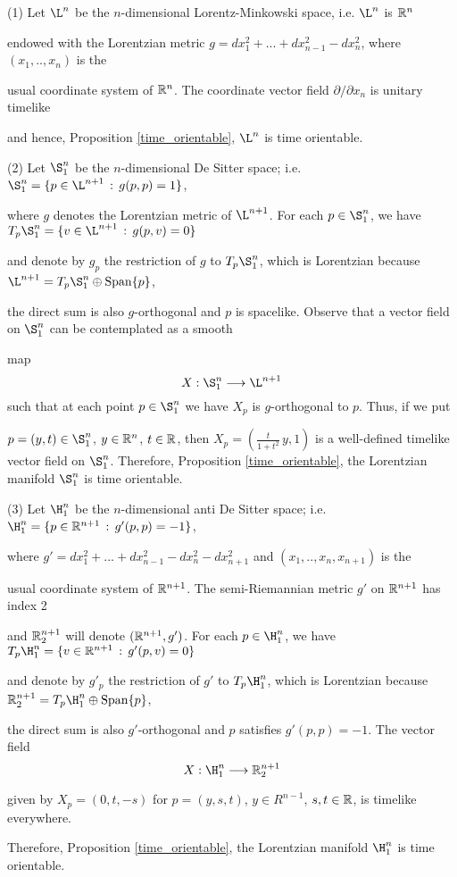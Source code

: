 \begin{exam}{\rm (1) Let $\L^n$ be the $n$-dimensional Lorentz-Minkowski space, i.e. $\L^n$ is $\mathbb{R}^n$

endowed with the Lorentzian metric $g=dx_1^2+...+dx_{n-1}^2-dx_n^2$, where $(x_1,..,x_n)$ is the

usual coordinate system of $\mathbb{R}^n$. The coordinate vector field $\partial/\partial x_n$ is unitary timelike

and hence, Proposition \ref{time_orientable}, $\L ^n$ is time orientable.


\vspace{2mm}


\noindent (2) Let $\S_1^n$ be the $n$-dimensional De Sitter space; i.e. $\S_1^n =\{p \in \L^{n+1} \, :\, g(p,p)=1 \}$,

where $g$ denotes the Lorentzian metric of $\L^{n+1}$. For each $p \in \S_1^n$, we have $T_p\S_1^n=\{v \in \L^{n+1} \, : \, g(p,v)=0\}$

and denote by $g_p$ the restriction of $g$ to $T_p\S_1^n$, which is Lorentzian because $\L^{n+1}=T_p\S_1^n \oplus \mathrm{Span}\{p\}$,

the direct sum is also $g$-orthogonal and $p$ is spacelike. Observe that a vector field on $\S_1^n$ can be contemplated as a smooth

map $$X : \S_1^n \longrightarrow \L^{n+1}$$ such that at each point $p \in \S_1^n$ we have $X_p$ is $g$-orthogonal to $p$. Thus, if we put

$p=(y,t)\in \S_1^n$, $y \in \mathbb{R}^n$, $t \in \mathbb{R}$, then $X_p=(\frac{t}{1+t^2}\,y,1)$ is a well-defined timelike vector field on $\S_1^n$. Therefore, Proposition \ref{time_orientable}, the Lorentzian manifold $\S_1^n$ is time orientable.


\vspace{2mm}


\noindent (3) Let $\H_1^n$ be the $n$-dimensional anti De Sitter space; i.e. $\H_1^n =\{p \in \R^{n+1} \, :\, g'(p,p)=-1 \}$,

where $g'=dx_1^2+...+dx_{n-1}^2-dx_n^2-dx_{n+1}^2$ and $(x_1,..,x_n,x_{n+1})$ is the

usual coordinate system of $\mathbb{R}^{n+1}$. The semi-Riemannian metric $g'$ on $\mathbb{R}^{n+1}$ has index 2

and $\mathbb{R}^{n+1}_2$ will denote $(\mathbb{R}^{n+1},g')$. For each $p \in \H_1^n$, we have $T_p\H_1^n=\{v \in \R^{n+1} \, : \, g'(p,v)=0\}$

and denote by $g'_p$ the restriction of $g'$ to $T_p\H_1^n$, which is Lorentzian because $\R^{n+1}_2=T_p\H_1^n \oplus \mathrm{Span}\{p\}$,

the direct sum is also $g'$-orthogonal and $p$ satisfies $g'(p,p)=-1$. The vector field $$X : \H_1^n \longrightarrow \R^{n+1}_2$$

given by $X_p=(0,t,-s)$ for $p=(y,s,t)$, $y \in R^{n-1}$, $s,t\in \mathbb{R}$, is timelike everywhere.

Therefore, Proposition \ref{time_orientable}, the Lorentzian manifold $\H_1^n$ is time orientable.}

\end{exam}



